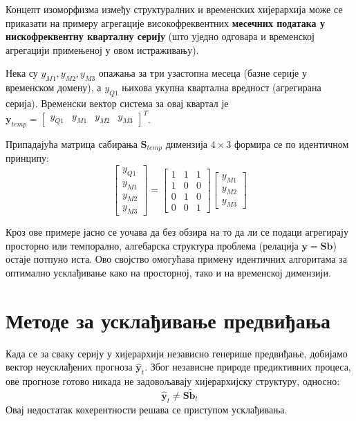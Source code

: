 \documentclass[12pt,oneside]{memoir}
\begin{document}
Концепт изоморфизма између структуралних и временских хијерархија може се приказати на примеру агрегације високофреквентних \textbf{месечних података у нискофреквентну кварталну серију} (што уједно одговара и временској агрегацији примењеној у овом истраживању).

Нека су $y_{M1}, y_{M2}, y_{M3}$ опажања за три узастопна месеца (базне серије у временском домену), а $y_{Q1}$ њихова укупна квартална вредност (агрегирана серија). Временски вектор система за овај квартал је $\mathbf{y}_{temp} = \begin{bmatrix} y_{Q1} & y_{M1} & y_{M2} & y_{M3} \end{bmatrix}^T$. 

Припадајућа матрица сабирања $\mathbf{S}_{temp}$ димензија $4 \times 3$ формира се по идентичном принципу:
\begin{equation}
    \begin{bmatrix} 
    y_{Q1} \\ \hline
    y_{M1} \\ 
    y_{M2} \\
    y_{M3} 
    \end{bmatrix} 
    = 
    \begin{bmatrix} 
    1 & 1 & 1 \\ \hline
    1 & 0 & 0 \\ 
    0 & 1 & 0 \\
    0 & 0 & 1 
    \end{bmatrix}
    \begin{bmatrix} 
    y_{M1} \\ 
    y_{M2} \\
    y_{M3} 
    \end{bmatrix}
\end{equation}

Кроз ове примере јасно се уочава да без обзира на то да ли се подаци агрегирају просторно или темпорално, алгебарска структура проблема (релација $\mathbf{y} = \mathbf{S}\mathbf{b}$) остаје потпуно иста. Ово својство омогућава примену идентичних алгоритама за оптимално усклађивање како на просторној, тако и на временској димензији.


\section{Методе за усклађивање предвиђања}

Када се за сваку серију у хијерархији независно генерише предвиђање, добијамо вектор неусклађених прогноза $\hat{\mathbf{y}}_t$. Због независне природе предиктивних процеса, ове прогнозе готово никада не задовољавају хијерархијску структуру, односно:
\begin{equation}
    \hat{\mathbf{y}}_t \neq \mathbf{S}\tilde{\mathbf{b}}_t
\end{equation}
Овај недостатак кохерентности решава се приступом усклађивања.
\end{document}

